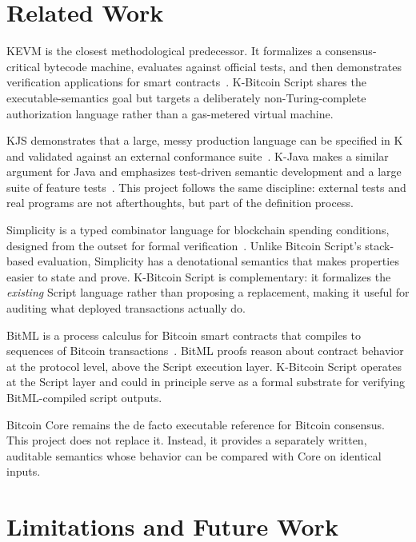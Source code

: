 \documentclass[conference]{IEEEtran}
\newcommand{\bitcoin}{Bitcoin\xspace}
\begin{document}
\section{Related Work}

KEVM is the closest methodological predecessor.  It formalizes a
consensus-critical bytecode machine, evaluates against official tests, and then
demonstrates verification applications for smart contracts~\cite{kevm}.
K-Bitcoin Script shares the executable-semantics goal but targets a deliberately
non-Turing-complete authorization language rather than a gas-metered virtual
machine.

KJS demonstrates that a large, messy production language can be specified in K
and validated against an external conformance suite~\cite{kjs}.  K-Java makes a
similar argument for Java and emphasizes test-driven semantic development and a
large suite of feature tests~\cite{kjava}.  This project follows the same
discipline: external tests and real programs are not afterthoughts, but part of
the definition process.

Simplicity is a typed combinator language for blockchain spending conditions,
designed from the outset for formal verification~\cite{simplicity}.  Unlike
Bitcoin Script's stack-based evaluation, Simplicity has a denotational
semantics that makes properties easier to state and prove.  K-Bitcoin Script is
complementary: it formalizes the \emph{existing} Script language rather than
proposing a replacement, making it useful for auditing what deployed
transactions actually do.

BitML is a process calculus for Bitcoin smart contracts that compiles to
sequences of Bitcoin transactions~\cite{bitml}.  BitML proofs reason about
contract behavior at the protocol level, above the Script execution layer.
K-Bitcoin Script operates at the Script layer and could in principle serve as a
formal substrate for verifying BitML-compiled script outputs.

Bitcoin Core remains the de facto executable reference for \bitcoin consensus.
This project does not replace it.  Instead, it provides a separately written,
auditable semantics whose behavior can be compared with Core on identical
inputs.

\section{Limitations and Future Work}
\end{document}
